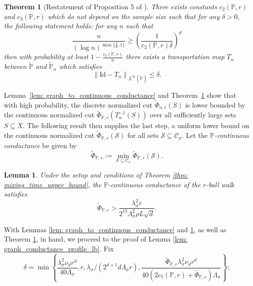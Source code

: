 \documentclass[11pt,twoside]{article}
\newtheorem{theorem}{Theorem}
\newtheorem{lemma}{Lemma}
\newcommand{\set}[1]{\left\{#1\right\}}
\newcommand{\norm}[1]{\left\lVert#1\right\rVert}
\newcommand{\1}{\mathbf{1}}
\newcommand{\Xbf}{X}             %
\newcommand{\Pbb}{\mathbb{P}}
\newcommand{\Sset}{\mathcal{S}}
\newcommand{\Cset}{\mathcal{C}}
\newcommand{\Csig}{\Cset_{\sigma}}
\begin{document}
\begin{theorem}[Restatement of Proposition 5 of \cite{garciatrillos16}]
	\label{thm: stagnating_transportation_maps}
	There exists constants $c_2(\Pbb,r)$ and $c_3(\Pbb,r)$ which do not depend on the sample size such that for any $\delta > 0$, the following statement holds: for any $n$ such that
	\begin{equation*}
	\frac{n}{(\log n)^{\max\{\frac{3}{d},1\}}} \geq \left(\frac{1}{c_2(\Pbb,r)\delta}\right)^{d}
	\end{equation*}
	then with probability at least $1 - \frac{c_3(\Pbb,r)}{n}$ there exists a transportation map $T_n$ between $\widetilde{\Pbb}$ and $\widetilde{\Pbb}_n$
	which satisfies
	\begin{equation*}
	\norm{\mathrm{Id} - T_n}_{L^{\infty}(\widetilde{\Pbb})} \leq \delta.
	\end{equation*}
\end{theorem}
Lemma~\ref{lem: graph_to_continuous_conductance} and Theorem~\ref{thm: stagnating_transportation_maps} show that with high probability, the discrete normalized cut $\widetilde{\Phi}_{n,r}(S)$ is lower bounded by the continuous normalized cut $\widetilde{\Phi}_{\Pbb,r}(T_n^{-1}(S))$ over all sufficiently large sets $S \subseteq \Xbf$. The following result then supplies the last step, a uniform lower bound on the continuous normalized cut $\widetilde{\Phi}_{\Pbb,r}(\Sset)$ for all sets $\Sset \subseteq \Csig$. Let the \emph{$\Pbb$-continuous conductance} be given by
\begin{equation*}
\widetilde{\Phi}_{\Pbb,r} := \min_{\Sset \subseteq \Csig} \widetilde{\Phi}_{\Pbb,r}(\Sset).
\end{equation*} 
\begin{lemma}
	\label{lem: nonuniform_continuous_conductance}
	Under the setup and conditions of Theorem \ref{thm: mixing_time_upper_bound}, the $\Pbb$-continuous conductance of the $r$-ball walk satisfies
	\begin{equation*}
	\widetilde{\Phi}_{\Pbb,r} > \frac{\lambda_{\sigma}^2 r}{2^{13} \Lambda_{\sigma}^2 \rho L \sqrt{d}}.
	\end{equation*}
\end{lemma}
With Lemmas \ref{lem: graph_to_continuous_conductance} and \ref{lem: nonuniform_continuous_conductance}, as well as Theorem \ref{thm: stagnating_transportation_maps}, in hand, we proceed to the proof of Lemma \ref{lem: graph_conductance_profile_lb}. Fix
\begin{equation*}
\delta = \min\set{\frac{\lambda_{\sigma}^2\nu_dr^d}{40\Lambda_{\sigma}},r, \lambda_{\sigma}/(2^{d+1}d\Lambda_{\sigma}r),\frac{\widetilde{\Phi}_{\Pbb,r} \lambda_{\sigma}^2\nu_dr^d}{40(2c_7(\Pbb,r) + \widetilde{\Phi}_{\Pbb,r}) \Lambda_{\sigma}}};
\end{equation*}
\end{document}

